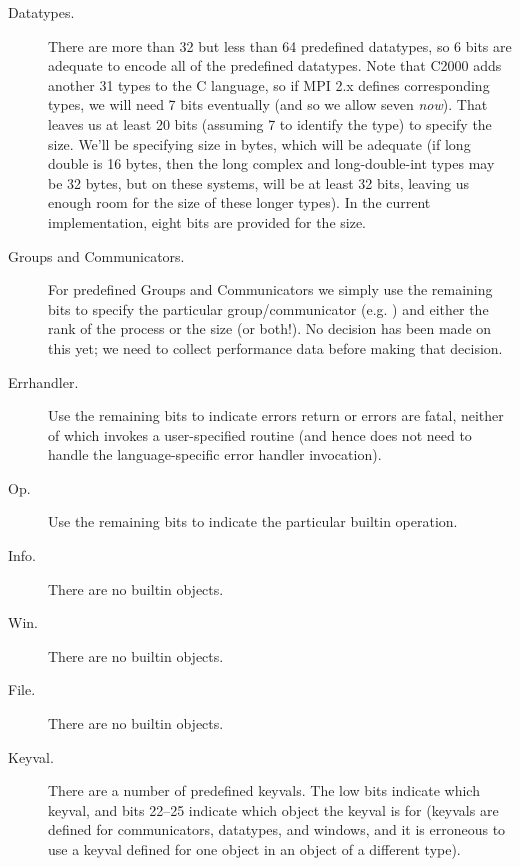 \documentclass{article}
\begin{document}
\begin{description}
\item[Datatypes.]
There are more than 32 but less than 64 predefined datatypes, so 6 bits are
adequate to encode all of the predefined datatypes.
Note that C2000 adds another 31 types to the C language, so if MPI 2.x
defines corresponding types, we will need 7 bits eventually (and so we
allow seven \emph{now}).
That leaves us at least 20 bits (assuming 7 to identify the type)
to specify the size.  We'll be specifying size in bytes,
which will be adequate (if long double is 16 bytes, then the long complex and
long-double-int types may be 32 bytes, but on these systems,
 will
be at least 32 bits, leaving us enough room for the size of these longer
types).  In the current implementation, eight bits are provided for
the size.

\item[Groups and Communicators.]
For predefined Groups and Communicators we simply use the remaining bits
to specify the particular group/communicator (e.g. ) and 
either the rank of the process or the size (or both!).  No decision
has been made on this yet; we need to collect performance data before
making that decision.


\item[Errhandler.] Use the remaining bits to indicate errors return or
errors are fatal, neither of which invokes a user-specified routine
(and hence does not need to handle the language-specific error handler
invocation).

\item[Op.] Use the remaining bits to indicate the particular builtin operation.

\item[Info.] There are no builtin  objects.
\item[Win.] There are no builtin  objects.
\item[File.] There are no builtin  objects.
\item[Keyval.] There are a number of predefined keyvals.  The low bits
  indicate which keyval, and bits 22--25 indicate which object the
  keyval is for (keyvals are defined for communicators, datatypes, and
  windows, and it is erroneous to use a keyval defined for one object
  in an object of a different type).
\end{description}
\end{document}
